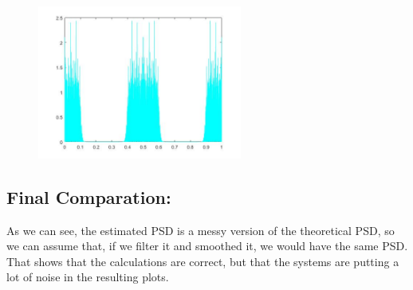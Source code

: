 \documentclass[a4paper,11pt]{article}
\begin{document}
\begin{figure}[!hp]
    \begin{center}
    \includegraphics[width=0.6\textwidth]{images/lab4_figure9.jpg}
    \end{center}
\end{figure}

\subsection{Final Comparation:}

As we can see, the estimated PSD is a messy version of the theoretical PSD, so we can assume that, if we filter it and smoothed it, we would have the same PSD. That shows that the calculations are correct, but that the systems are putting a lot of noise in the resulting plots.

\vspace{4cm}
\end{document}
